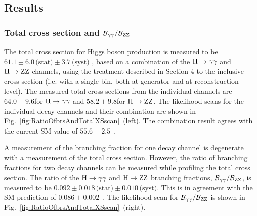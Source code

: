 \subsection{Results}


\subsubsection{Total cross section and \texorpdfstring{$\mathcal{B}_{\mathrm{\gamma}\mathrm{\gamma}}/\mathcal{B}_{\mathrm{Z}\mathrm{Z}}$}{BRgg/BRZZ}}


The total cross section for Higgs boson production is measured to be
$61.1   \pm 6.0 \,\text{(stat)}   \pm 3.7 \,\text{(syst)}  $\pb
, based on a combination of the $\mathrm{H}\to\mathrm{\gamma}\mathrm{\gamma}$ and $\mathrm{H}\to\mathrm{Z}\mathrm{Z}$ channels, using the treatment described in Section 4 to the inclusive cross section (i.e. with a single bin, both at generator and at reconstruction level).
% 
The measured total cross sections from the individual channels are $64.0\pm9.6$\pb for $\mathrm{H}\to\mathrm{\gamma}\mathrm{\gamma}$ and $58.2\pm9.8$\pb for $\mathrm{H}\to\mathrm{Z}\mathrm{Z}$.
% 
The likelihood scans for the individual decay channels and their combination are shown in Fig.~\ref{fig:RatioOfbrsAndTotalXSscan}~(left).
% 
The combination result agrees with the current SM value of $55.6\pm2.5$\pb~\cite{deFlorian:2016spz}.


A measurement of the branching fraction for one decay channel is degenerate with a measurement of the total cross section.
% 
However, the ratio of branching fractions for two decay channels can be measured while profiling the total cross section.
% 
The ratio of the $\mathrm{H}\to\mathrm{\gamma}\mathrm{\gamma}$ and $\mathrm{H}\to\mathrm{Z}\mathrm{Z}$ branching fractions, $\mathcal{B}_{\mathrm{\gamma}\mathrm{\gamma}}/\mathcal{B}_{\mathrm{Z}\mathrm{Z}}$, is measured to be
$0.092   \pm 0.018 \,\text{(stat)}   \pm 0.010 \,\text{(syst)}  $.
% 
This is in agreement with the SM prediction of $0.086 \pm 0.002$~\cite{deFlorian:2016spz}.
% 
The likelihood scan for $\mathcal{B}_{\mathrm{\gamma}\mathrm{\gamma}}/\mathcal{B}_{\mathrm{Z}\mathrm{Z}}$ is shown in Fig.~\ref{fig:RatioOfbrsAndTotalXSscan}~(right).


